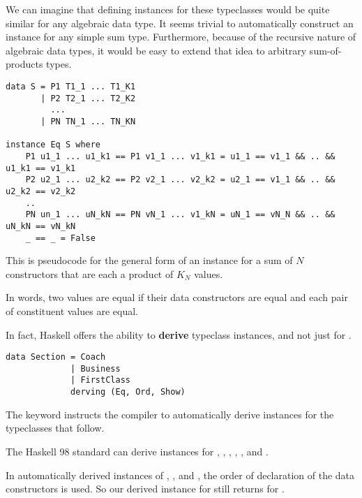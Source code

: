 We can imagine that defining instances for these typeclasses would be quite similar for any algebraic
data type. It seems trivial to automatically construct an  instance for any simple sum type.
Furthermore, because of the recursive nature of algebraic data types, it would be easy to extend that
idea to arbitrary sum-of-products types. 

\begin{lstlisting}
data S = P1 T1_1 ... T1_K1
       | P2 T2_1 ... T2_K2
         ...
       | PN TN_1 ... TN_KN

instance Eq S where
    P1 u1_1 ... u1_k1 == P1 v1_1 ... v1_k1 = u1_1 == v1_1 && .. && u1_k1 == v1_k1
    P2 u2_1 ... u2_k2 == P2 v2_1 ... v2_k2 = u2_1 == v1_1 && .. && u2_k2 == v2_k2
    ..
    PN un_1 ... uN_kN == PN vN_1 ... v1_kN = uN_1 == vN_N && .. && uN_kN == vN_kN
    _ == _ = False
\end{lstlisting}

\begin{notelist}
    \item This is pseudocode for the general form of an  instance for a sum of
          $N$ constructors that are each a product of $K_N$ values.
    \item In words, two  values are equal if their data constructors are equal and
          each pair of constituent values are equal.
\end{notelist}

In fact, Haskell offers the ability to \textbf{derive} typeclass instances, and not just for 
.

\begin{lstlisting}
data Section = Coach
             | Business
             | FirstClass
             derving (Eq, Ord, Show)
\end{lstlisting}

\begin{notelist}
    \item The  keyword instructs the compiler to automatically derive instances
          for the typeclasses that follow.
    \item The Haskell 98 standard can derive instances for , , ,
          , , and .
    \item In automatically derived instances of , , and ,
          the order of declaration of the data constructors is used. So our derived
           instance for  still returns  for  .
\end{notelist}

